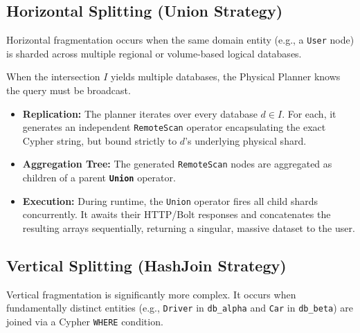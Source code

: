 \documentclass{article}
\begin{document}
\subsection{Horizontal Splitting (Union Strategy)}
Horizontal fragmentation occurs when the same domain entity (e.g., a \texttt{User} node) is sharded across multiple regional or volume-based logical databases.

When the intersection \(I\) yields multiple databases, the Physical Planner knows the query must be broadcast.
\begin{itemize}
    \item \textbf{Replication:} The planner iterates over every database \(d \in I\). For each, it generates an independent \texttt{RemoteScan} operator encapsulating the exact Cypher string, but bound strictly to \(d\)'s underlying physical shard.
    \item \textbf{Aggregation Tree:} The generated \texttt{RemoteScan} nodes are aggregated as children of a parent \textbf{\texttt{Union}} operator.
    \item \textbf{Execution:} During runtime, the \texttt{Union} operator fires all child shards concurrently. It awaits their HTTP/Bolt responses and concatenates the resulting arrays sequentially, returning a singular, massive dataset to the user.
\end{itemize}

\subsection{Vertical Splitting (HashJoin Strategy)}
Vertical fragmentation is significantly more complex. It occurs when fundamentally distinct entities (e.g., \texttt{Driver} in \texttt{db\_alpha} and \texttt{Car} in \texttt{db\_beta}) are joined via a Cypher \texttt{WHERE} condition.
\end{document}
